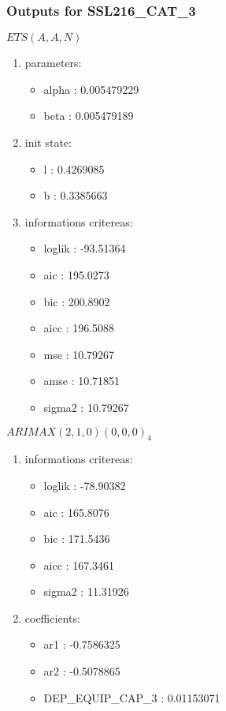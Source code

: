 \documentclass[10pt,a4paper]{article}\usepackage[]{graphicx}\usepackage[]{color}
\newcommand{\AaA}{\_}
\begin{document}
\subsubsection{Outputs for SSL216\AaA CAT\AaA 3}
\begin{multicols}{2}


$ ETS(A,A,N) $
\begin{enumerate}
\item parameters:
\begin{itemize}
\item  alpha :  0.005479229 
\item  beta :  0.005479189 
\end{itemize}
\item init state:
\begin{itemize}
\item  l :  0.4269085 
\item  b :  0.3385663 
\end{itemize}
\item informations critereas:
\begin{itemize}
\item  loglik :  -93.51364 
\item  aic :  195.0273 
\item  bic :  200.8902 
\item  aicc :  196.5088 
\item  mse :  10.79267 
\item  amse :  10.71851 
\item  sigma2 :  10.79267 
\end{itemize}
\end{enumerate}

\columnbreak


 $ARIMAX(2,1,0)(0,0,0)_{4}$ 
\begin{enumerate}
\item informations critereas:
\begin{itemize}
\item  loglik :  -78.90382 
\item  aic :  165.8076 
\item  bic :  171.5436 
\item  aicc :  167.3461 
\item  sigma2 :  11.31926 
\end{itemize}

\item coefficients:
\begin{itemize}
\item  ar1 :  -0.7586325 
\item  ar2 :  -0.5078865 
\item  DEP\AaA EQUIP\AaA CAP\AaA 3 :  0.01153071 
\end{itemize}
\end{enumerate}
\end{multicols}
\end{document}
